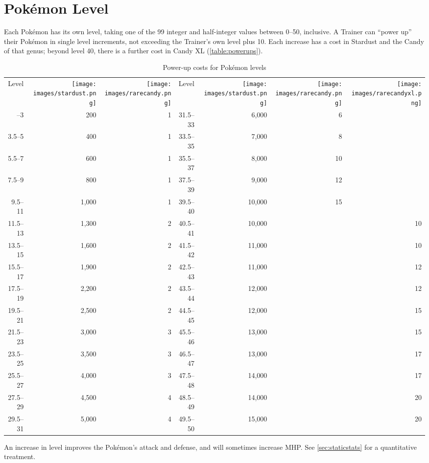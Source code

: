 \section{Pokémon Level\label{sec:plevel}}
Each Pokémon has its own level, taking one of the 99 integer and half-integer
 values between 0--50, inclusive.
A Trainer can ``power up'' their Pokémon in single level increments,
 not exceeding the Trainer's own level plus 10.
Each increase has a cost in Stardust and the Candy of that genus; beyond level 40, there
  is a further cost in Candy XL (\autoref{table:powerups}).
\begin{table}
\centering
\begin{tabular}[ht]{rrr|rrrr}
Level &
\texttt{[image: images/stardust.png]} &
\texttt{[image: images/rarecandy.png]} &
Level &
\texttt{[image: images/stardust.png]} &
\texttt{[image: images/rarecandy.png]} &
\texttt{[image: images/rarecandyxl.png]} \\
\Midrule
1.5--3 &   200 & 1 & 31.5--33 &  6,000 &  6 & \\
3.5--5 &   400 & 1 & 33.5--35 &  7,000 &  8 & \\
5.5--7 &   600 & 1 & 35.5--37 &  8,000 & 10 & \\
7.5--9 &   800 & 1 & 37.5--39 &  9,000 & 12 & \\
9.5--11 & 1,000 & 1 & 39.5--40 & 10,000 & 15 & \\
11.5--13 & 1,300 & 2 & 40.5--41 & 10,000 &    & 10 \\
13.5--15 & 1,600 & 2 & 41.5--42 & 11,000 &    & 10 \\
15.5--17 & 1,900 & 2 & 42.5--43 & 11,000 &    & 12 \\
17.5--19 & 2,200 & 2 & 43.5--44 & 12,000 &    & 12 \\
19.5--21 & 2,500 & 2 & 44.5--45 & 12,000 &    & 15 \\
21.5--23 & 3,000 & 3 & 45.5--46 & 13,000 &    & 15 \\
23.5--25 & 3,500 & 3 & 46.5--47 & 13,000 &    & 17 \\
25.5--27 & 4,000 & 3 & 47.5--48 & 14,000 &    & 17 \\ 
27.5--29 & 4,500 & 4 & 48.5--49 & 14,000 &    & 20 \\
29.5--31 & 5,000 & 4 & 49.5--50 & 15,000 &    & 20 \\
\end{tabular}
\caption{Power-up costs for Pokémon levels\label{table:powerups}}
\end{table}
An increase in level improves the Pokémon's attack and defense, and
  will sometimes increase MHP\@.
See \autoref{sec:staticstats} for a quantitative treatment.

